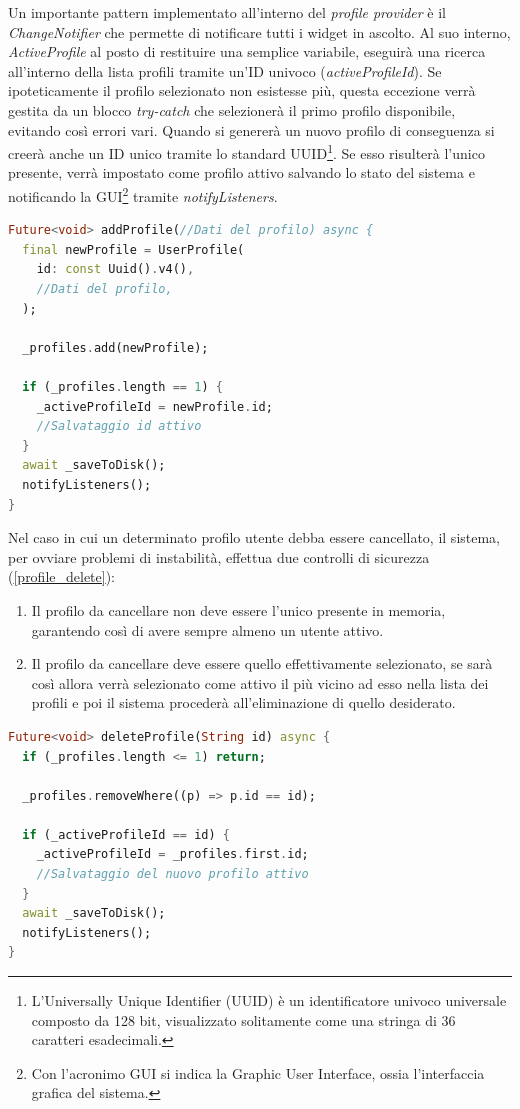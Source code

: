 \documentclass[target=bach,aauheader=,style=]{thud}
\begin{document}
Un importante pattern implementato all'interno del \textit{profile provider} è il \textit{ChangeNotifier} che permette di notificare tutti i widget in ascolto.
Al suo interno, \textit{ActiveProfile} al posto di restituire una semplice variabile, eseguirà una ricerca all'interno della lista profili tramite un'ID univoco (\textit{activeProfileId}). Se ipoteticamente il profilo selezionato non esistesse più, questa eccezione verrà gestita da un blocco \textit{try-catch} che selezionerà il primo profilo disponibile, evitando così errori vari. Quando si genererà un nuovo profilo di conseguenza si creerà anche un ID unico tramite lo standard UUID\footnote{L'Universally Unique Identifier (UUID) è un identificatore univoco universale composto da 128 bit, visualizzato solitamente come una stringa di 36 caratteri esadecimali.}. Se esso risulterà l'unico presente, verrà impostato come profilo attivo salvando lo stato del sistema e notificando la GUI\footnote{Con l'acronimo GUI si indica la Graphic User Interface, ossia l'interfaccia grafica del sistema.} tramite \textit{notifyListeners}.

\begin{lstlisting}[language=dart, caption={Aggiunta di un nuovo utente e generazione dell'identificatore.}, label={profile_add}]
Future<void> addProfile(//Dati del profilo) async {
  final newProfile = UserProfile(
    id: const Uuid().v4(),
    //Dati del profilo,
  );

  _profiles.add(newProfile);
  
  if (_profiles.length == 1) {
    _activeProfileId = newProfile.id;
    //Salvataggio id attivo
  }
  await _saveToDisk();
  notifyListeners();
}
\end{lstlisting}
Nel caso in cui un determinato profilo utente debba essere cancellato, il sistema, per ovviare problemi di instabilità, effettua due controlli di sicurezza (\ref{profile_delete}): 
\begin{enumerate}
  \item Il profilo da cancellare non deve essere l'unico presente in memoria, garantendo così di avere sempre almeno un utente attivo.
  \item Il profilo da cancellare deve essere quello effettivamente selezionato, se sarà così allora verrà selezionato come attivo il più vicino ad esso nella lista dei profili e poi il sistema procederà all'eliminazione di quello desiderato.
\end{enumerate}

\begin{lstlisting}[language=dart, caption={Eliminazione con protezione dell'ultimo profilo rimanente.}, label={profile_delete}]
Future<void> deleteProfile(String id) async {
  if (_profiles.length <= 1) return;

  _profiles.removeWhere((p) => p.id == id);
  
  if (_activeProfileId == id) {
    _activeProfileId = _profiles.first.id;
    //Salvataggio del nuovo profilo attivo
  }
  await _saveToDisk();
  notifyListeners();
}
\end{lstlisting}
\end{document}
